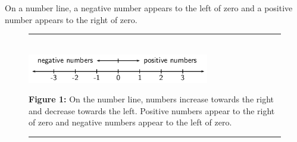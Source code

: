         \label{m38346*id173850}On a number line, a negative number appears to the left of zero and a positive
number appears to the right of zero.\par 
    \setcounter{subfigure}{0}
	\begin{figure}[H] %
    \begin{center}
    \rule[.1in]{\figurerulewidth}{.005in} \\
        \label{m38346*uid21!!!underscore!!!media}\label{m38346*uid21!!!underscore!!!printimage}\includegraphics[width=300px]{col11306.imgs/m38346_MG10C2_001.png} %
      \vspace{2pt}
    \vspace{\rubberspace}\par \begin{cnxcaption}
	  \small \textbf{Figure 1: }On the number line, numbers increase towards the right and decrease
towards the left. Positive numbers appear to the right of zero and negative
numbers appear to the left of zero.
	\end{cnxcaption}
    \vspace{.1in}
    \rule[.1in]{\figurerulewidth}{.005in} \\
    \end{center}
 \end{figure}       
      \label{m38346*uid22}
